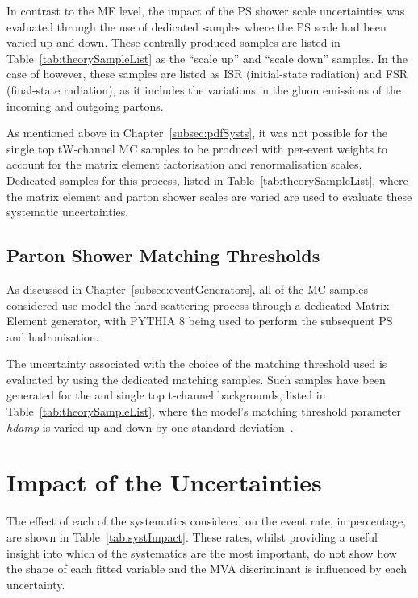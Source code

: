 In contrast to the ME level, the impact of the PS shower scale uncertainties was evaluated through the use of dedicated samples where the PS scale had been varied up and down.
These centrally produced samples are listed in Table~\ref{tab:theorySampleList} as the ``scale up'' and ``scale down'' samples.
In the case of \ttbar however, these samples are listed as ISR (initial-state radiation) and FSR (final-state radiation), as it includes the variations in the gluon emissions of the incoming and outgoing partons.

As mentioned above in Chapter~\ref{subsec:pdfSysts}, it was not possible for the single top tW-channel MC samples to be produced with per-event weights to account for the matrix element factorisation and renormalisation scales.
Dedicated samples for this process, listed in Table~\ref{tab:theorySampleList}, where the matrix element and parton shower scales are varied are used to evaluate these systematic uncertainties.

\subsection{Parton Shower Matching Thresholds}
As discussed in Chapter~\ref{subsec:eventGenerators}, all of the MC samples considered use model the hard scattering process through a dedicated Matrix Element generator, with PYTHIA 8 being used to perform the subsequent PS and hadronisation.

The uncertainty associated with the choice of the matching threshold used is evaluated by using the dedicated matching samples.
Such samples have been generated for the \ttbar and single top t-channel backgrounds, listed in Table~\ref{tab:theorySampleList}, where the model's matching threshold parameter \emph{hdamp} is varied up and down by one standard deviation~\cite{CMS:2016kle}.

\section{Impact of the Uncertainties}
The effect of each of the systematics considered on the event rate, in percentage, are shown in Table~\ref{tab:systImpact}.
These rates, whilst providing a useful insight into which of the systematics are the most important, do not show how the shape of each fitted variable and the MVA discriminant is influenced by each uncertainty.

